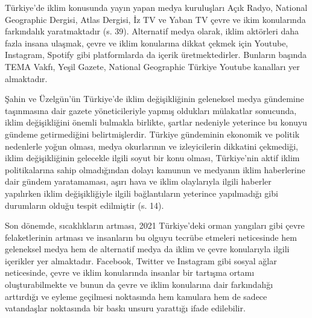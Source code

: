 \documentclass[
]{book}
\begin{document}
Türkiye'de iklim konusunda yayın yapan medya kuruluşları Açık Radyo, National Geographic Dergisi, Atlas Dergisi, İz TV ve Yaban TV çevre ve ikim konularında farkındalık yaratmaktadır (s. 39). \citep{ozmen2011cevre} Alternatif medya olarak, iklim aktörleri daha fazla insana ulaşmak, çevre ve iklim konularına dikkat çekmek için Youtube, Instagram, Spotify gibi platformlarda da içerik üretmektedirler. Bunların başında TEMA Vakfı, Yeşil Gazete, National Geographic Türkiye Youtube kanalları yer almaktadır.

Şahin ve Üzelgün'ün Türkiye'de iklim değişikliğinin geleneksel medya gündemine taşınmasına dair gazete yöneticileriyle yapmış oldukları mülakatlar sonucunda, iklim değişikliğini önemli bulmakla birlikte, şartlar nedeniyle yeterince bu konuyu gündeme getirmediğini belirtmişlerdir. Türkiye gündeminin ekonomik ve politik nedenlerle yoğun olması, medya okurlarının ve izleyicilerin dikkatini çekmediği, iklim değişikliğinin gelecekle ilgili soyut bir konu olması, Türkiye'nin aktif iklim politikalarına sahip olmadığından dolayı kamunun ve medyanın iklim haberlerine dair gündem yaratamaması, aşırı hava ve iklim olaylarıyla ilgili haberler yapılırken iklim değişikliğiyle ilgili bağlantıların yeterince yapılmadığı gibi durumların olduğu tespit edilmiştir (s. 14). \citep{sahin2016iklim}

Son dönemde, sıcaklıkların artması, 2021 Türkiye'deki orman yangıları gibi çevre felaketlerinin artması ve insanların bu olguyu tecrübe etmeleri neticesinde hem geleneksel medya hem de alternatif medya da iklim ve çevre konularıyla ilgili içerikler yer almaktadır. Facebook, Twitter ve Instagram gibi sosyal ağlar neticesinde, çevre ve iklim konularında insanlar bir tartışma ortamı oluşturabilmekte ve bunun da çevre ve iklim konularına dair farkındalığı arttırdığı ve eyleme geçilmesi noktasında hem kamulara hem de sadece vatandaşlar noktasında bir baskı unsuru yarattığı ifade edilebilir.
\end{document}
